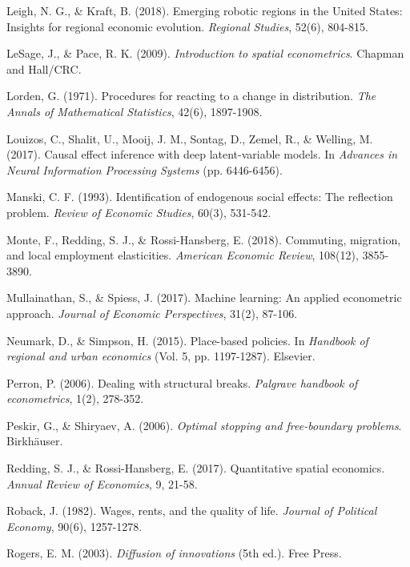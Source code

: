 \begin{thebibliography}{99}
Leigh, N. G., \& Kraft, B. (2018). Emerging robotic regions in the United States: Insights for regional economic evolution. \textit{Regional Studies}, 52(6), 804-815.

LeSage, J., \& Pace, R. K. (2009). \textit{Introduction to spatial econometrics}. Chapman and Hall/CRC.

Lorden, G. (1971). Procedures for reacting to a change in distribution. \textit{The Annals of Mathematical Statistics}, 42(6), 1897-1908.

Louizos, C., Shalit, U., Mooij, J. M., Sontag, D., Zemel, R., \& Welling, M. (2017). Causal effect inference with deep latent-variable models. In \textit{Advances in Neural Information Processing Systems} (pp. 6446-6456).

Manski, C. F. (1993). Identification of endogenous social effects: The reflection problem. \textit{Review of Economic Studies}, 60(3), 531-542.

Monte, F., Redding, S. J., \& Rossi-Hansberg, E. (2018). Commuting, migration, and local employment elasticities. \textit{American Economic Review}, 108(12), 3855-3890.

Mullainathan, S., \& Spiess, J. (2017). Machine learning: An applied econometric approach. \textit{Journal of Economic Perspectives}, 31(2), 87-106.

Neumark, D., \& Simpson, H. (2015). Place-based policies. In \textit{Handbook of regional and urban economics} (Vol. 5, pp. 1197-1287). Elsevier.

Perron, P. (2006). Dealing with structural breaks. \textit{Palgrave handbook of econometrics}, 1(2), 278-352.

Peskir, G., \& Shiryaev, A. (2006). \textit{Optimal stopping and free-boundary problems}. Birkhäuser.

Redding, S. J., \& Rossi-Hansberg, E. (2017). Quantitative spatial economics. \textit{Annual Review of Economics}, 9, 21-58.

Roback, J. (1982). Wages, rents, and the quality of life. \textit{Journal of Political Economy}, 90(6), 1257-1278.

Rogers, E. M. (2003). \textit{Diffusion of innovations} (5th ed.). Free Press.


\end{thebibliography}
